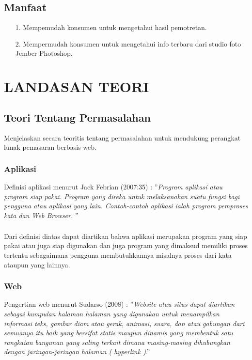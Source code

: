 \documentclass{jtetiproposalskripsi}
\begin{document}
\section{Manfaat}
\begin{itemize}
\item[1.]Mempemudah konsumen untuk mengetahui hasil pemotretan. 
\item[2.]Mempermudah konsumen untuk mengetahui info terbaru dari studio foto Jember Photoshop.

\end{itemize}


\chapter{LANDASAN TEORI}                

\section{Teori Tentang Permasalahan}
Menjelaskan secara teoritis tentang permasalahan untuk mendukung perangkat lunak pemasaran berbasis web.
\subsection{Aplikasi}
Definisi aplikasi menurut Jack Febrian (2007:35) :
''\textit{Program aplikasi atau program siap pakai. Program yang direka untuk melaksanakan suatu fungsi bagi pengguna atau aplikasi yang lain. Contoh-contoh aplikasi ialah program pemproses kata dan Web Browser.} '' 
\paragraph{}
Dari definisi diatas dapat diartikan bahwa aplikasi merupakan program yang siap pakai atau juga siap digunakan dan juga program yang dimaksud memiliki proses tertentu  sebagaimana pengguna membutuhkannya misalnya proses dari kata ataupun yang lainnya.


\subsection{Web}
Pengertian  web  menurut  Sudarso  (2008)  :
''\textit{Website atau situs dapat diartikan sebagai kumpulan halaman halaman yang digunakan untuk menampilkan informasi teks, gambar diam atau gerak, animasi, suara, dan atau gabungan dari semuanya itu baik yang bersifat statis maupun dinamis yang membentuk satu rangkaian bangunan yang saling terkait dimana masing-masing dihubungkan dengan jaringan-jaringan halaman ( hyperlink )}.''
\end{document}
